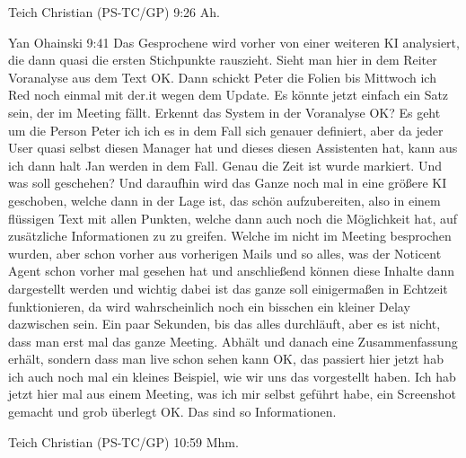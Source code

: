 Teich Christian (PS-TC/GP)   9:26
Ah.

Yan Ohainski   9:41
Das Gesprochene wird vorher von einer weiteren KI analysiert, die dann quasi die ersten Stichpunkte rauszieht. Sieht man hier in dem Reiter Voranalyse aus dem Text OK. Dann schickt Peter die Folien bis Mittwoch ich Red noch einmal mit der.it wegen dem Update. Es könnte jetzt einfach ein Satz sein, der im Meeting fällt.
Erkennt das System in der Voranalyse OK? Es geht um die Person Peter ich ich es in dem Fall sich genauer definiert, aber da jeder User quasi selbst diesen Manager hat und dieses diesen Assistenten hat, kann aus ich dann halt Jan werden in dem Fall.
Genau die Zeit ist wurde markiert. Und was soll geschehen? Und daraufhin wird das Ganze noch mal in eine größere KI geschoben, welche dann in der Lage ist, das schön aufzubereiten, also in einem flüssigen Text mit allen Punkten, welche dann auch noch die Möglichkeit hat, auf zusätzliche Informationen zu zu greifen.
Welche im nicht im Meeting besprochen wurden, aber schon vorher aus vorherigen Mails und so alles, was der Noticent Agent schon vorher mal gesehen hat und anschließend können diese Inhalte dann dargestellt werden und wichtig dabei ist das ganze soll einigermaßen in Echtzeit funktionieren, da wird wahrscheinlich noch ein bisschen ein kleiner Delay dazwischen sein. Ein paar Sekunden, bis das alles durchläuft, aber es ist nicht, dass man erst mal das ganze Meeting.
Abhält und danach eine Zusammenfassung erhält, sondern dass man live schon sehen kann OK, das passiert hier jetzt hab ich auch noch mal ein kleines Beispiel, wie wir uns das vorgestellt haben. Ich hab jetzt hier mal aus einem Meeting, was ich mir selbst geführt habe, ein Screenshot gemacht und grob überlegt OK. Das sind so Informationen.

Teich Christian (PS-TC/GP)   10:59
Mhm.

